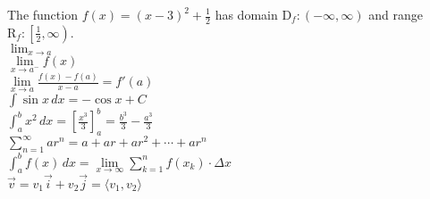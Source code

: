 \documentclass[11pt]{article}
\begin{document}
The function $f(x)=(x-3)^2 + \frac{1}{2}$ has domain $\mathrm{D}_f:(-\infty,\infty)$ and range $\mathrm{R}_f:\left[\frac{1}{2},\infty\right)$.\\

$\lim_{x \to a}$\\

$\lim\limits_{x \to a^-}f(x)$\\

$\displaystyle{\lim\limits_{x \to a}\frac{f(x)-f(a)}{x-a}=f'(a)}$\\

$\displaystyle{\int \sin x \,dx=-\cos x+C}$\\

$\displaystyle{\int_{a}^{b}x^2\,dx}=\left[\frac{x^3}{3}\right]_{a}^{b}= \frac{b^3}{3}-\frac{a^3}{3}$\\

$\displaystyle{\sum \limits_{n=1}^{\infty}ar^n = a+ar+ar^2+ \cdots+ar^n}$\\

$\displaystyle{\int_{a}^{b}f(x)\,dx = \lim\limits_{x \to \infty}\sum\limits_{k=1}^{n}}f(x_k)\cdot\Delta x$\\

$\vec{v}=v_1\vec{i}+v_2 \vec{j}=\langle v_1, v_2 \rangle$
\end{document}
